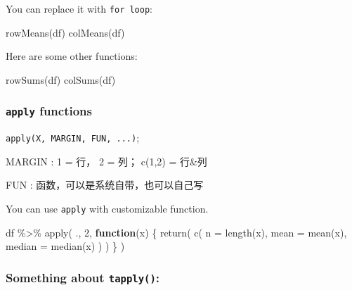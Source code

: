 \documentclass[
]{article}
\newenvironment{Shaded}{}{}
\newcommand{\AttributeTok}[1]{\textcolor[rgb]{0.49,0.56,0.16}{#1}}
\newcommand{\ControlFlowTok}[1]{\textcolor[rgb]{0.00,0.44,0.13}{\textbf{#1}}}
\newcommand{\DecValTok}[1]{\textcolor[rgb]{0.25,0.63,0.44}{#1}}
\newcommand{\FunctionTok}[1]{\textcolor[rgb]{0.02,0.16,0.49}{#1}}
\newcommand{\NormalTok}[1]{#1}
\newcommand{\SpecialCharTok}[1]{\textcolor[rgb]{0.25,0.44,0.63}{#1}}
\begin{document}
You can replace it with \texttt{for\ loop}:

\begin{Shaded}
\begin{Highlighting}[]
\FunctionTok{rowMeans}\NormalTok{(df)}
\FunctionTok{colMeans}\NormalTok{(df)}
\end{Highlighting}
\end{Shaded}

Here are some other functions:

\begin{Shaded}
\begin{Highlighting}[]
\FunctionTok{rowSums}\NormalTok{(df)}
\FunctionTok{colSums}\NormalTok{(df)}
\end{Highlighting}
\end{Shaded}

\hypertarget{apply-functions}{%
\subsubsection{\texorpdfstring{\texttt{apply}
functions}{apply functions}}\label{apply-functions}}

\texttt{apply(X,\ MARGIN,\ FUN,\ ...)};

MARGIN : 1 = 行， 2 = 列； c(1,2) = 行\&列

FUN : 函数，可以是系统自带，也可以自己写

You can use \texttt{apply} with customizable function.

\begin{Shaded}
\begin{Highlighting}[]
\NormalTok{df }\SpecialCharTok{\%\textgreater{}\%} \FunctionTok{apply}\NormalTok{(}
\NormalTok{  ., }
  \DecValTok{2}\NormalTok{, }
  \ControlFlowTok{function}\NormalTok{(x) \{ }
    \FunctionTok{return}\NormalTok{(}
      \FunctionTok{c}\NormalTok{(}
        \AttributeTok{n =} \FunctionTok{length}\NormalTok{(x), }
        \AttributeTok{mean =} \FunctionTok{mean}\NormalTok{(x), }
        \AttributeTok{median =} \FunctionTok{median}\NormalTok{(x) }
\NormalTok{      )}
\NormalTok{    )}
\NormalTok{  \} }
\NormalTok{)}
\end{Highlighting}
\end{Shaded}

\hypertarget{something-about-tapply}{%
\subsubsection{\texorpdfstring{Something about
\texttt{tapply()}:}{Something about tapply():}}\label{something-about-tapply}}
\end{document}
